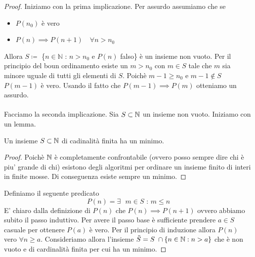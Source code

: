 \begin{proof}
    Iniziamo con la prima implicazione. Per assurdo assumiamo che se
    \begin{itemize}
        \item $P(n_0)$ è vero
        \item $P(n) \implies P(n+1) \quad \forall n>n_0 $
    \end{itemize}
    Allora $S \coloneqq $ \{$n\in \mathbb{N}$ : $n> n_0$ e $P(n)$ falso\} è un insieme non vuoto. Per il principio del boun ordinamento esiste un $m > n_0$ con $m \in S$ tale che $m$ sia minore uguale di tutti gli elementi di $S$. Poichè $m-1\ge n_0$ e $m-1 \not \in S$  $P(m-1)$ è vero. Usando il fatto che $P(m-1) \implies P(m)$ otteniamo un assurdo. \\ \\
    Facciamo la seconda implicazione. Sia $S \subset \mathbb{N}$ un insieme non vuoto. Iniziamo con un lemma.
\begin{lemma}
    Un insieme $S \subset \mathbb{N}$ di cadinalità finita ha un minimo.
\end{lemma}
\begin{proof}
    Poichè $\mathbb{N}$ è completamente confrontabile (ovvero posso sempre dire chi è piu' grande di chi) esistono degli algoritmi per ordinare un insieme finito di interi in finite mosse. Di conseguenza esiste sempre un minimo.
\end{proof}
 Definiamo il seguente predicato
\begin{equation}
    P(n) = \text{$\exists$ $m\in S$ : $m\le n$}
\end{equation}
E' chiaro dalla definizione di $P(n)$ che $P(n) \implies P(n+1)$ ovvero abbiamo subito il passo induttivo. Per avere il passo base è sufficiente prendere $a\in S$ casuale per ottenere  $P(a)$ è vero. Per il principio di induzione allora $P(n)$ vero $\forall n \ge a$. Consideriamo allora l'insieme $\tilde{S} = S \; \cap \{n\in \mathbb{N} : n>a\}$ che è non vuoto e di cardinalità finita per cui ha un minimo.
\end{proof}

